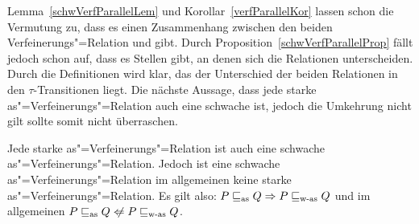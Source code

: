 Lemma~\ref{schwVerfParallelLem} und Korollar~\ref{verfParallelKor} lassen schon
die Vermutung zu, dass es einen Zusammenhang zwischen den beiden
Verfeinerungs"=Relation \wasRel{} und \asRel{} gibt. Durch
Proposition~\ref{schwVerfParallelProp} fällt jedoch schon auf, dass es Stellen
gibt, an denen sich die Relationen unterscheiden. Durch die Definitionen wird
klar, das der Unterschied der beiden Relationen in den $\tau$-Transitionen
liegt. Die nächste Aussage, dass jede starke as"=Verfeinerungs"=Relation auch
eine schwache ist, jedoch die Umkehrung nicht gilt sollte somit nicht
überraschen.

\begin{Lem}[Zusammenhang der Verfeinerungs"=Relationen]
  \label{ZusammenhWasAsLem}
  Jede starke as"=Verfeinerungs"=Relation ist auch eine schwache
  as"=Verfeinerungs"=Relation. Jedoch ist eine schwache
  as"=Verfeinerungs"=Relation im allgemeinen keine starke
  as"=Verfeinerungs"=Relation. Es gilt also: $P \sqsubseteq _{\mathrm{as}} Q \Rightarrow P \sqsubseteq _{\mathrm{w}\text{-}\mathrm{as}}
  Q$ und im allgemeinen $P \asRel Q \hspace{0.1cm}\not\hspace{-0.1cm}\Leftarrow
  P \wasRel Q$.
\end{Lem}

